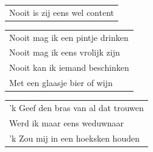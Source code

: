 \documentclass[a4paper, 14pt]{extarticle}
\begin{document}
\begin{flushleft}
\begin{tabularx}{0.8\textwidth} {
   >{\raggedright\arraybackslash}X}
Nooit is zij eens wel content\\
\end{tabularx}
\end{flushleft}\begin{flushleft}
\begin{tabularx}{0.8\textwidth} {
   >{\raggedright\arraybackslash}X}
Nooit mag ik een pintje drinken\\
Nooit mag ik eens vrolijk zijn\\
Nooit kan ik iemand beschinken\\
Met een glaasje bier of wijn\\
\end{tabularx}
\end{flushleft}\begin{flushleft}
\begin{tabularx}{0.8\textwidth} {
   >{\raggedright\arraybackslash}X}
’k Geef den bras van al dat trouwen\\
Werd ik maar eens weduwnaar\\
’k Zou mij in een hoeksken houden\\
\end{tabularx}
\end{flushleft}
\end{document}
